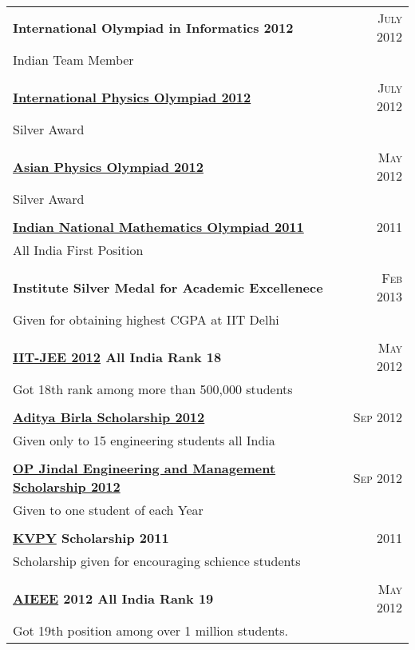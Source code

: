\documentclass[letterpaper,11pt]{article}
\begin{document}
\begin{tabular*}{7in}{l@{\extracolsep{\fill}}r}
 \textbf{International Olympiad in Informatics 2012}  & \textsc{July 2012} \\
Indian Team Member \\\\
 \textbf{\href{http://www.ipho2012.ee/silver-medalists/}{International Physics Olympiad 2012}}  & \textsc{July 2012} \\
Silver Award\\\\
 \textbf{\href{http://www.apho2012india.org/apho-2012/results}{Asian Physics Olympiad 2012}} & \textsc{May 2012} \\
Silver Award\\\\
 \textbf{\href{http://olympiads.hbcse.tifr.res.in/subjects/mathematics/inmo-2011-awardees/at_download/file}{Indian National Mathematics Olympiad 2011}} & \textsc{2011} \\
All India First Position \\\\
 \textbf{Institute Silver Medal for Academic Excellenece } & \textsc{Feb 2013} \\
Given for obtaining highest CGPA at IIT Delhi\\\\
 \textbf{\href{http://jee.iitd.ac.in/}{IIT-JEE 2012} All India Rank 18} & \textsc{May 2012} \\
Got 18th rank among more than 500,000 students\\\\
 \textbf{\href{http://www.adityabirlascholars.net/abgs_circle/2012.aspx}{Aditya Birla Scholarship 2012}} & \textsc{Sep 2012} \\
Given only to 15 engineering students all India\\\\
 \textbf{\href{http://www.opjems.com/opjems_scholars.aspx}{OP Jindal Engineering and Management Scholarship 2012}} & \textsc{Sep 2012} \\
Given to one student of each Year\\\\
 \textbf{\href{http://www.kvpy.org.in/main/}{KVPY} Scholarship 2011} & \textsc{2011} \\
Scholarship given for encouraging schience students \\\\
 \textbf{\href{http://aieee.nic.in/aieee2012/aieee/welcome.html}{AIEEE} 2012 All India Rank 19} & \textsc{May 2012} \\
Got 19th position among over 1 million students.
\end{tabular*}
\end{document}

